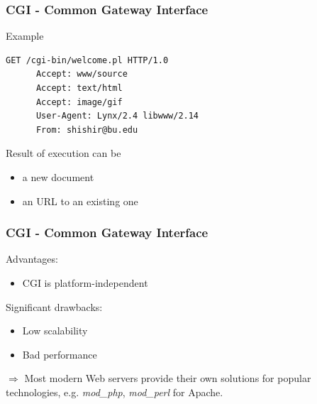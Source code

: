 \documentclass[9pt]{beamer}
\begin{document}
\begin{frame}[fragile]
\frametitle<presentation>{CGI - Common Gateway Interface}

  \begin{exampleblock}{Example}
    \begin{lstlisting}[captionpos=b,caption={Client request for CGI program. Taken from \cite{gundavaram1996cgi}},label=lst:cgiProgram]
      GET /cgi-bin/welcome.pl HTTP/1.0
      Accept: www/source
      Accept: text/html
      Accept: image/gif
      User-Agent: Lynx/2.4 libwww/2.14
      From: shishir@bu.edu
    \end{lstlisting}
  \end{exampleblock}
\end{frame}

\begin{frame}
  Result of execution can be
  
  \begin{itemize}
    \item a new document 
    \item an URL to an existing one
  \end{itemize}
  
  \frametitle<presentation>{CGI - Common Gateway Interface}

  
  \begin{multicols}{2}
     Advantages:
     \begin{itemize}
       \item CGI is platform-independent 
     \end{itemize}
     \vfill
     \columnbreak 
     
    Significant drawbacks:
    \begin{itemize}
      \item Low scalability
      \item Bad performance
    \end{itemize}
  \end{multicols}
    
  $\Longrightarrow $ Most modern Web servers provide their own solutions for popular technologies, e.g. \emph{mod\_php}, \emph{mod\_perl} for Apache.
  
\end{frame}
\end{document}
